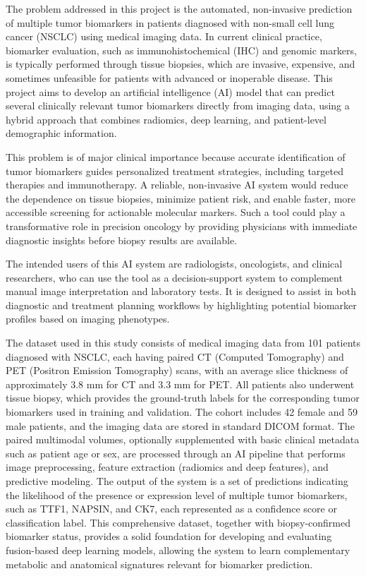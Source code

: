 The problem addressed in this project is the automated, non-invasive prediction of multiple tumor biomarkers in patients diagnosed with non-small cell lung cancer (NSCLC) using medical imaging data. In current clinical practice, biomarker evaluation, such as immunohistochemical (IHC) and genomic markers, is typically performed through tissue biopsies, which are invasive, expensive, and sometimes unfeasible for patients with advanced or inoperable disease. This project aims to develop an artificial intelligence (AI) model that can predict several clinically relevant tumor biomarkers directly from imaging data, using a hybrid approach that combines radiomics, deep learning, and patient-level demographic information.

This problem is of major clinical importance because accurate identification of tumor biomarkers guides personalized treatment strategies, including targeted therapies and immunotherapy. A reliable, non-invasive AI system would reduce the dependence on tissue biopsies, minimize patient risk, and enable faster, more accessible screening for actionable molecular markers. Such a tool could play a transformative role in precision oncology by providing physicians with immediate diagnostic insights before biopsy results are available.

The intended users of this AI system are radiologists, oncologists, and clinical researchers, who can use the tool as a decision-support system to complement manual image interpretation and laboratory tests. It is designed to assist in both diagnostic and treatment planning workflows by highlighting potential biomarker profiles based on imaging phenotypes.

The dataset used in this study consists of medical imaging data from 101 patients diagnosed with NSCLC, each having paired CT (Computed Tomography) and PET (Positron Emission Tomography) scans, with an average slice thickness of approximately 3.8 mm for CT and 3.3 mm for PET. All patients also underwent tissue biopsy, which provides the ground-truth labels for the corresponding tumor biomarkers used in training and validation. The cohort includes 42 female and 59 male patients, and the imaging data are stored in standard DICOM format. The paired multimodal volumes, optionally supplemented with basic clinical metadata such as patient age or sex, are processed through an AI pipeline that performs image preprocessing, feature extraction (radiomics and deep features), and predictive modeling. The output of the system is a set of predictions indicating the likelihood of the presence or expression level of multiple tumor biomarkers, such as TTF1, NAPSIN, and CK7, each represented as a confidence score or classification label. \cite{Shao2022-yo} This comprehensive dataset, together with biopsy-confirmed biomarker status, provides a solid foundation for developing and evaluating fusion-based deep learning models, allowing the system to learn complementary metabolic and anatomical signatures relevant for biomarker prediction.


